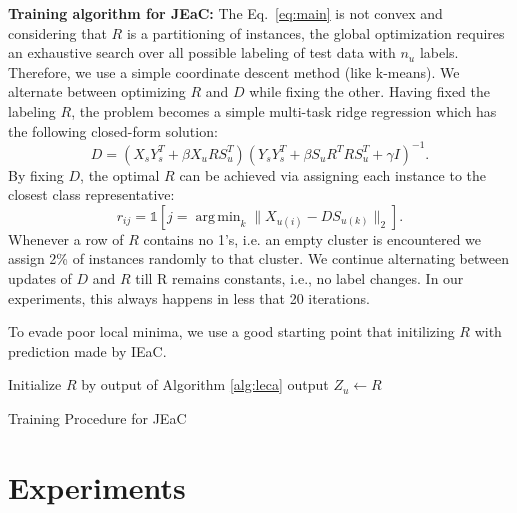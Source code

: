 \documentclass[letterpaper]{article}
\DeclareMathOperator*{\argmin}{arg\,min}
\begin{document}
\textbf{Training algorithm for JEaC: }
The Eq.~\eqref{eq:main} is not convex and considering that $R$ is a partitioning of instances, the global optimization requires an
exhaustive search over all possible labeling of test data with $n_u$ labels. Therefore, we use a simple coordinate descent
method (like k-means). We alternate between optimizing $R$ and $D$ while fixing the other.
Having fixed the labeling $R$, the problem becomes a simple multi-task ridge regression which has the following closed-form solution:
\begin{equation} \label{eq:d_update}
  D = (X_s Y_s^T + \beta X_u R S_u^T) (Y_s Y_s^T + \beta S_u R^T R S_u^T  + \gamma I)^{-1}.
\end{equation}
By fixing $D$, the optimal $R$ can be achieved via assigning each instance to the closest class representative:
\begin{equation} \label{eq:r_update}
  r_{ij} = \mathds{1}[j = \argmin_{k} \lVert X_{u(i)} - D S_{u(k)} \rVert_2 ].
\end{equation}
Whenever a row of $R$ contains no 1's, i.e.  an empty cluster is encountered we assign 2\% of instances randomly to that cluster.
We continue alternating between updates of $D$ and $R$ till R remains constants, i.e., no label changes. In our experiments, this always happens
in less that 20 iterations.

To evade poor local minima, we use a good starting point that initilizing $R$ with prediction made by IEaC.
\begin{algorithm}[t]
   \label{alg:jeac}
  {\small
  \BlankLine
  Initialize $R$ by output of Algorithm \ref{alg:leca} \;
  output $Z_u \leftarrow R$
 }
 \caption{Training Procedure for JEaC}
\end{algorithm}

\section{Experiments} \label{experiments}
\end{document}
